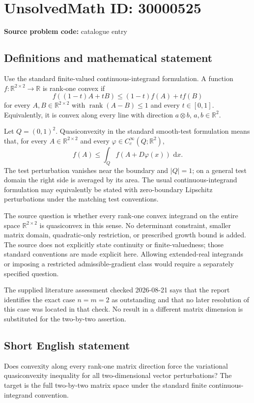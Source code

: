 \documentclass[11pt]{article}
\newcommand{\R}{\mathbb{R}}
\newcommand{\dd}{\,\mathrm{d}}
\begin{document}
\section*{UnsolvedMath ID: 30000525}
\textbf{Source problem code:} catalogue entry
\subsection{Definitions and mathematical statement}
Use the standard finite-valued continuous-integrand formulation. A function \(f:\R^{2\times2}\to\R\) is rank-one convex if
\[
f((1-t)A+tB)\leq(1-t)f(A)+tf(B)
\]
for every \(A,B\in\R^{2\times2}\) with \(\operatorname{rank}(A-B)\leq1\) and every \(t\in[0,1]\). Equivalently, it is convex along every line with direction \(a\otimes b\), \(a,b\in\R^2\).

Let \(Q=(0,1)^2\). Quasiconvexity in the standard smooth-test formulation means that, for every \(A\in\R^{2\times2}\) and every \(\varphi\in C_c^\infty(Q;\R^2)\),
\[
f(A)\leq\int_Q f(A+D\varphi(x))\,\dd x.
\]
The test perturbation vanishes near the boundary and \(|Q|=1\); on a general test domain the right side is averaged by its area. The usual continuous-integrand formulation may equivalently be stated with zero-boundary Lipschitz perturbations under the matching test conventions.

The source question is whether every rank-one convex integrand on the entire space \(\R^{2\times2}\) is quasiconvex in this sense. No determinant constraint, smaller matrix domain, quadratic-only restriction, or prescribed growth bound is added. The source does not explicitly state continuity or finite-valuedness; those standard conventions are made explicit here. Allowing extended-real integrands or imposing a restricted admissible-gradient class would require a separately specified question.

The supplied literature assessment checked 2026-08-21 says that the report identifies the exact case \(n=m=2\) as outstanding and that no later resolution of this case was located in that check. No result in a different matrix dimension is substituted for the two-by-two assertion.
\subsection{Short English statement}
Does convexity along every rank-one matrix direction force the variational quasiconvexity inequality for all two-dimensional vector perturbations? The target is the full two-by-two matrix space under the standard finite continuous-integrand convention.
\end{document}
